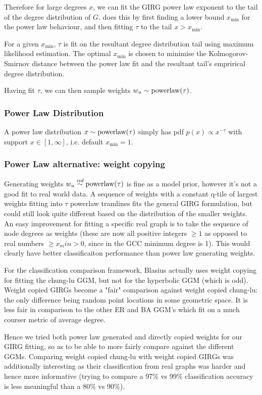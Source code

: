 Therefore for large degrees $x$, we can fit the GIRG power law exponent to the tail of the degree distribution of $G$. \PLP does this by first finding a lower bound $x_{\min}$ for the power law behaviour, and then fitting $\tau$ to the tail $x > x_{\min}$.


For a given $x_{\min}$, $\tau$ is fit on the resultant degree distribution tail using maximum likelihood estimation. The optimal $x_{\min}$ is chosen to minimise the Kolmogorov-Smirnov distance between the power law fit and the resultant tail's emprirical degree distribution.

Having fit $\tau$, we can then sample weights $w_u \sim \operatorname{powerlaw}(\tau)$.

\subsubsection{Power Law Distribution}
A power law distribution $x \sim \operatorname{powerlaw}(\tau)$ simply has pdf $p(x) \propto x^{-\tau}$ with support $x \in [1, \infty]$, i.e. default $x_{\min} = 1$.

\subsubsection{Power Law alternative: weight copying}
Generating weights $w_u \stackrel{iid}{\sim} \operatorname{powerlaw}(\tau)$ is fine as a model prior, however it's not a good fit to real world data. A sequence of weights with a constant q-tile of largest weights fitting into $\tau$ powerlaw tramlines fits the general GIRG formulation, but could still look quite different based on the distribution of the smaller weights. An easy improvement for fitting a specific real graph is to take the sequence of node degrees as weights (these are now all positive integers $\geq 1$ as opposed to real numbers $\geq x_min > 0$, since in the GCC minimum degree is 1). This would clearly have better classificaiton performance than power law generating weights.

For the classification comparison framework, Blasius actually uses weight copying for fitting the chung-lu GGM, but not for the hyperbolic GGM (which is odd). Weight copied GIRGs become a "fair" comparison against weight copied chung-lu: the only difference being random point locations in some geometric space. It is less fair in comparison to the other ER and BA GGM's which fit on a much courser metric of average degree.

Hence we tried both power law generated and directly copied weights for our GIRG fitting, so as to be able to more fairly compare against the different GGMs. Comparing weight copied chung-lu with weight copied GIRGs was additionally interesting as their classification from real graphs was harder and hence more informative (trying to compare a 97\% vs 99\% classification accuracy is less meaningful than a 80\% vs 90\%).

